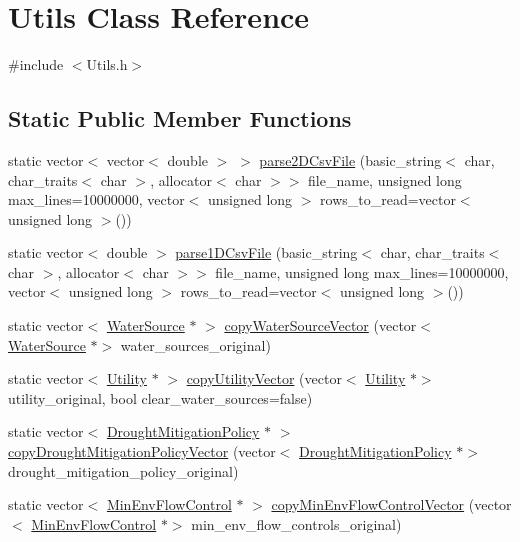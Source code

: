 \hypertarget{classUtils}{}\section{Utils Class Reference}
\label{classUtils}


{\ttfamily \#include $<$Utils.\+h$>$}

\subsection*{Static Public Member Functions}
\begin{DoxyCompactItemize}
\item 
static vector$<$ vector$<$ double $>$ $>$ \mbox{\hyperlink{classUtils_ab1dced1d690056b012aec72d28cd4176}{parse2\+D\+Csv\+File}} (basic\+\_\+string$<$ char, char\+\_\+traits$<$ char $>$, allocator$<$ char $>$$>$ file\+\_\+name, unsigned long max\+\_\+lines=10000000, vector$<$ unsigned long $>$ rows\+\_\+to\+\_\+read=vector$<$ unsigned long $>$())
\item 
static vector$<$ double $>$ \mbox{\hyperlink{classUtils_a575cc5fb290f083a3101a8f0969ae483}{parse1\+D\+Csv\+File}} (basic\+\_\+string$<$ char, char\+\_\+traits$<$ char $>$, allocator$<$ char $>$$>$ file\+\_\+name, unsigned long max\+\_\+lines=10000000, vector$<$ unsigned long $>$ rows\+\_\+to\+\_\+read=vector$<$ unsigned long $>$())
\item 
static vector$<$ \mbox{\hyperlink{classWaterSource}{Water\+Source}} $\ast$ $>$ \mbox{\hyperlink{classUtils_ad83b39de47909892725f2d9a8ee0ff1a}{copy\+Water\+Source\+Vector}} (vector$<$ \mbox{\hyperlink{classWaterSource}{Water\+Source}} $\ast$$>$ water\+\_\+sources\+\_\+original)
\item 
static vector$<$ \mbox{\hyperlink{classUtility}{Utility}} $\ast$ $>$ \mbox{\hyperlink{classUtils_aae13775d0c17ca43ae39450188958d7d}{copy\+Utility\+Vector}} (vector$<$ \mbox{\hyperlink{classUtility}{Utility}} $\ast$$>$ utility\+\_\+original, bool clear\+\_\+water\+\_\+sources=false)
\item 
static vector$<$ \mbox{\hyperlink{classDroughtMitigationPolicy}{Drought\+Mitigation\+Policy}} $\ast$ $>$ \mbox{\hyperlink{classUtils_ac387c706746bffa0308e1fad7a6cd7a6}{copy\+Drought\+Mitigation\+Policy\+Vector}} (vector$<$ \mbox{\hyperlink{classDroughtMitigationPolicy}{Drought\+Mitigation\+Policy}} $\ast$$>$ drought\+\_\+mitigation\+\_\+policy\+\_\+original)
\item 
static vector$<$ \mbox{\hyperlink{classMinEnvFlowControl}{Min\+Env\+Flow\+Control}} $\ast$ $>$ \mbox{\hyperlink{classUtils_af0041ddac14b680b4039e378b060b6f7}{copy\+Min\+Env\+Flow\+Control\+Vector}} (vector$<$ \mbox{\hyperlink{classMinEnvFlowControl}{Min\+Env\+Flow\+Control}} $\ast$$>$ min\+\_\+env\+\_\+flow\+\_\+controls\+\_\+original)

\end{DoxyCompactItemize}
